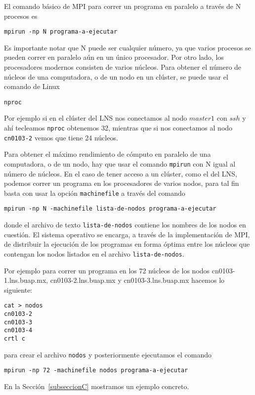 \documentclass[letter]{jpconf}
\begin{document}
El comando b\'asico de MPI para correr un programa en paralelo a trav\'es de N procesos  es
\color{blue}
\begin{verbatim}
mpirun -np N programa-a-ejecutar
\end{verbatim}
\color{black}
Es importante notar que N puede ser cualquier n\'umero, ya que varios procesos se pueden correr en paralelo a\'un en un \'unico procesador.
Por otro lado,  los procesadores modernos consisten de varios n\'ucleos. Para obtener el n\'umero de n\'ucleos de una computadora, o de un nodo en un cl\'uster, se puede usar el comando de Linux 
\color{blue}
\begin{verbatim}
nproc
\end{verbatim}
\color{black}
Por ejemplo si en el cl\'uster del LNS nos conectamos al nodo $master1$ con $ssh$ y ah\'i tecleamos \texttt{nproc} obtenemos 32, mientras que si nos conectamos al nodo \texttt{cn0103-2} vemos que tiene 24 n\'ucleos. 

Para obtener el m\'aximo rendimiento de c\'omputo en paralelo de una computadora, o de un nodo, hay que usar el comando  \texttt{mpirun}  con N igual al n\'umero de n\'ucleos.
En el caso de tener acceso a un cl\'uster, como el del LNS, podemos correr un programa en los procesadores de varios nodos, para tal fin basta con usar la opci\'on  \texttt{machinefile} 
a trav\'es del comando

\color{blue}
\begin{verbatim}
mpirun -np N -machinefile lista-de-nodos programa-a-ejecutar
\end{verbatim}
\color{black}
donde el archivo de texto   \texttt{lista-de-nodos} contiene los nombres de los nodos en cuesti\'on. El sistema operativo se encarga, a trav\'es de 
la implementaci\'on de MPI, de distribuir la ejecuci\'on de los programas en forma \'optima entre los n\'ucleos que contengan los nodos listados en el archivo \texttt{lista-de-nodos}.

Por ejemplo para correr un programa en los 72 n\'ucleos de los nodos cn0103-1.lns.buap.mx, cn0103-2.lns.buap.mx y cn0103-3.lns.buap.mx hacemos lo siguiente:
\color{blue}
\begin{verbatim}
cat > nodos
cn0103-2
cn0103-3
cn0103-4 
crtl c
\end{verbatim}
\color{black}
para crear el archivo  \texttt{nodos} y posteriormente ejecutamos el comando
\color{blue}
\begin{verbatim}
mpirun -np 72 -machinefile nodos programa-a-ejecutar
\end{verbatim}
\color{black}
En la Secci\'on~\ref{subseccionC} mostramos un ejemplo concreto.
\end{document}
